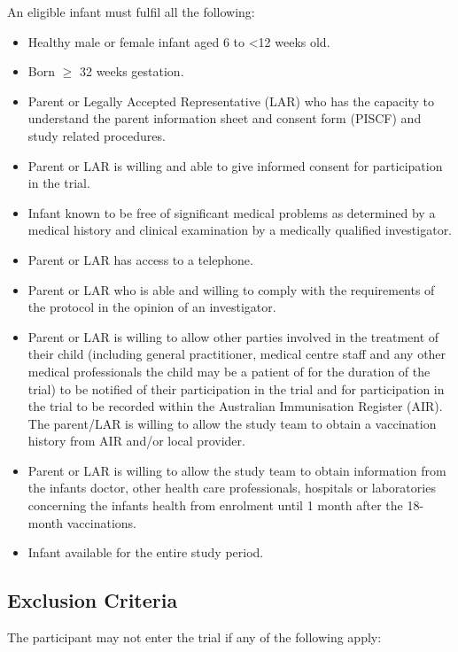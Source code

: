 \documentclass{bmcart}
\begin{document}
An eligible infant must fulfil all the following:

\begin{itemize}
	\item Healthy male or female infant aged 6 to \textless12 weeks old.
	\item Born $\geq$ 32 weeks gestation.
	\item
	Parent or Legally Accepted Representative (LAR) who has the capacity to understand the parent information sheet and consent form (PISCF) and study related procedures.
	\item Parent or LAR is willing and able to give informed consent for participation in the trial.
	\item Infant known to be free of significant medical problems as determined by a medical history and clinical examination by a medically qualified investigator.
	\item Parent or LAR has access to a telephone.
	\item Parent or LAR who is able and willing to comply with the requirements of the protocol in the opinion of an investigator.
	\item Parent or LAR is willing to allow other parties involved in the treatment of their child (including general practitioner, medical centre staff and any other medical professionals the child may be a patient of for the duration of the trial) to be notified of their participation in the trial and for participation in the trial to be recorded within the Australian Immunisation Register (AIR). The parent/LAR is willing to allow the study team to obtain a vaccination history from AIR and/or local provider.
	\item Parent or LAR is willing to allow the study team to obtain information from the infants doctor, other health care professionals, hospitals or laboratories concerning the infants health from enrolment until 1 month after the 18-month vaccinations.
	\item Infant available for the entire study period.
\end{itemize}


\subsection*{Exclusion Criteria}

The participant may not enter the trial if any of the following apply:
\end{document}
